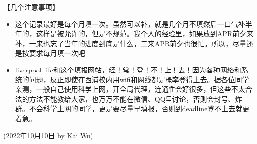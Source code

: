 \vspace{5mm}
【几个注意事项】
\begin{itemize}
    \item 这个记录最好是每个月填一次。虽然可以补，就是几个月不填然后一口气补半年的，这样是被允许的，但是不规范。我个人的经验里，如果放到APR前夕来补，一来也忘了当年的进度到底是什么，二来APR前夕也很忙。所以，尽量还是按要求每月填一次吧
    \item liverpool life和这个填报网站，经！常！登！不！上！去！因为各种网络和系统的问题，反正即使在西浦校内用wifi和网线都是概率登得上去。据各位同学亲测，一般自己使用科学上网，开全局代理，连通性会好很多，但这些不太合法的方法不能教给大家，也万万不能在微信、QQ里讨论，否则会封号、炸群。不会科学上网的同学，更是要尽量早填报，否则到deadline登不上去就更着急。
\end{itemize}

\begin{flushright}
    (2022年10月10日 by Kai Wu)
    \end{flushright}